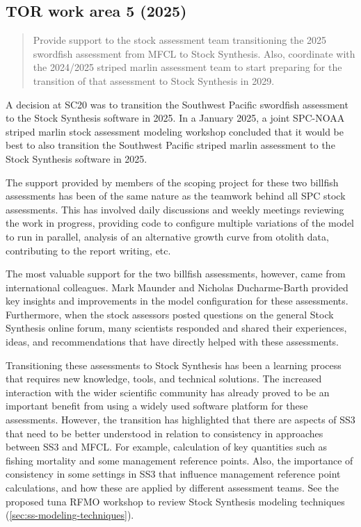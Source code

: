 \documentclass{SCreport}
\begin{document}
\hypertarget{link:tor-5}{}
\subsection{TOR work area 5 (2025)}
\label{sec:tor-5}

\begin{quote}\sf
  Provide support to the stock assessment team transitioning the 2025 swordfish
  assessment from MFCL to Stock Synthesis. Also, coordinate with the 2024/2025
  striped marlin assessment team to start preparing for the transition of that
  assessment to Stock Synthesis in 2029.
\end{quote}

\vspace{1ex}

A decision at SC20 was to transition the Southwest Pacific swordfish assessment
to the Stock Synthesis software in 2025. In a January 2025, a joint SPC-NOAA
striped marlin stock assessment modeling workshop concluded that it would be
best to also transition the Southwest Pacific striped marlin assessment to the
Stock Synthesis software in 2025.

The support provided by members of the scoping project for these two billfish
assessments has been of the same nature as the teamwork behind all SPC stock
assessments. This has involved daily discussions and weekly meetings reviewing
the work in progress, providing code to configure multiple variations of the
model to run in parallel, analysis of an alternative growth curve from otolith
data, contributing to the report writing, etc.

The most valuable support for the two billfish assessments, however, came from
international colleagues. Mark Maunder and Nicholas Ducharme-Barth provided key
insights and improvements in the model configuration for these assessments.
Furthermore, when the stock assessors posted questions on the general Stock
Synthesis online forum, many scientists responded and shared their experiences,
ideas, and recommendations that have directly helped with these assessments.

Transitioning these assessments to Stock Synthesis has been a learning process
that requires new knowledge, tools, and technical solutions. The increased
interaction with the wider scientific community has already proved to be an
important benefit from using a widely used software platform for these
assessments. However, the transition has highlighted that there are aspects of
SS3 that need to be better understood in relation to consistency in approaches
between SS3 and MFCL. For example, calculation of key quantities such as fishing
mortality and some management reference points. Also, the importance of
consistency in some settings in SS3 that influence management reference point
calculations, and how these are applied by different assessment teams. See the
proposed tuna RFMO workshop to review Stock Synthesis modeling techniques
(\autoref{sec:ss-modeling-techniques}).
\end{document}
